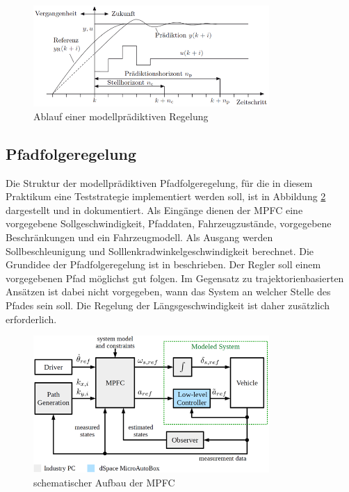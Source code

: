 \begin{figure}
    \centering
    \includegraphics[width=0.8\textwidth]{figures/2_Grundlagen/MPC_Diagramm.png}
    \caption{Ablauf einer modellprädiktiven Regelung \cite{adamy2014}}
    \label{fig:MPC}
\end{figure}

\subsection{Pfadfolgeregelung}
Die Struktur der modellprädiktiven Pfadfolgeregelung, für die in diesem Praktikum eine Teststrategie implementiert werden soll, ist in Abbildung \ref{fig:MPFC_Schema} dargestellt und in \cite{ritschel2019} dokumentiert. Als Eingänge dienen der MPFC eine vorgegebene Sollgeschwindigkeit, Pfaddaten, Fahrzeugzustände, vorgegebene Beschränkungen und ein Fahrzeugmodell. Als Ausgang werden Sollbeschleunigung und Solllenkradwinkelgeschwindigkeit berechnet. Die Grundidee der Pfadfolgeregelung ist in \cite{Faulwasser2009} beschrieben. Der Regler soll einem vorgegebenen Pfad möglichst gut folgen. Im Gegensatz zu trajektorienbasierten Ansätzen ist dabei nicht vorgegeben, wann das System an welcher Stelle des Pfades sein soll. Die Regelung der Längsgeschwindigkeit ist daher zusätzlich erforderlich.
\begin{figure}
    \centering
    \includegraphics[width=0.8\textwidth]{figures/2_Grundlagen/MPFC_Schema.png}
    \caption{schematischer Aufbau der MPFC \cite{ritschel2019}}
    \label{fig:MPFC_Schema}
\end{figure}

